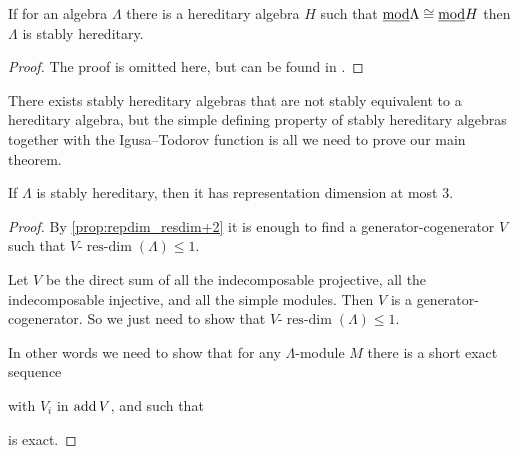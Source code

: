 \begin{prop}
	If for an algebra $\Lambda$ there is a hereditary algebra $H$ such that $\underline{\mod}\Lambda \cong \underline{\mod}H$ then $\Lambda$ is stably hereditary.
	\begin{proof}
		The proof is omitted here, but can be found in \cite[Chapter~IV, Theorem~1.5]{AR73}.
	\end{proof}
\end{prop}

There exists stably hereditary algebras that are not stably equivalent to a hereditary algebra, but the simple defining property of stably hereditary algebras together with the Igusa--Todorov function is all we need to prove our main theorem.

\begin{theorem}\cite[Theorem~3.5]{Xi02}\label{thm:stably_hereditary_repdim_3}
	If $\Lambda$ is stably hereditary, then it has representation dimension at most 3.
	\begin{proof}
		By \cref{prop:repdim_resdim+2} it is enough to find a generator-cogenerator $V$ such that $V$-$\operatorname{res-dim}(\Lambda) \leq 1$.
		
		Let $V$ be the direct sum of all the indecomposable projective, all the indecomposable injective, and all the simple modules. Then $V$ is a generator-cogenerator. So we just need to show that  $V$-$\operatorname{res-dim}(\Lambda) \leq 1$.
		
		In other words we need to show that for any $\Lambda$-module $M$ there is a short exact sequence 
		\begin{center}
		\end{center}
		with $V_i$ in $\add V$, and such that 
		\begin{center}
		\end{center}
		is exact. 
		

\end{proof}
\end{theorem}
